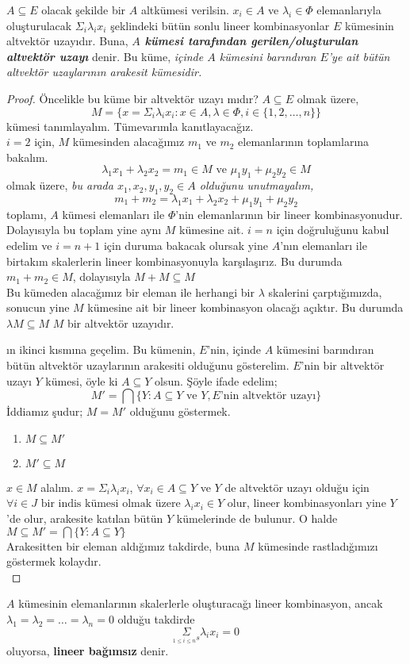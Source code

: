 \documentclass[11pt]{article}
\theoremstyle{plain}
\theoremstyle{definition}
\theoremstyle{remark}
\numberwithin{equation}{section}
\renewcommand{\%}{{\small \%}}
\begin{document}
$A\subseteq E$ olacak şekilde bir $A$ altkümesi verilsin. $x_{i}\in A$ ve $\lambda_{i}\in\Phi$ elemanlarıyla oluşturulacak $\Sigma_{i}\lambda_{i}x_i$ şeklindeki bütün sonlu lineer kombinasyonlar $E$ kümesinin altvektör uzayıdır. Buna,\emph{\textbf{ $A$ kümesi tarafından gerilen/oluşturulan altvektör uzayı}} denir. Bu küme, \emph{içinde $A$ kümesini barındıran $E$'ye ait bütün altvektör uzaylarının arakesit kümesidir.}

\begin{proof}
Öncelikle bu küme bir altvektör uzayı mıdır? $A\subseteq E$ olmak üzere, 
\[
M=\big\{x=\Sigma_{i}\lambda_{i}x_i:  x\in A, \lambda\in\Phi, i\in\{1,2,\ldots ,n\}\big\} 
\]
kümesi tanımlayalım. Tümevarımla kanıtlayacağız.\\
$i=2$ için, $M$ kümesinden alacağımız $m_1$ ve $m_2$ elemanlarının toplamlarına bakalım. 
\[
\lambda_1 x_1 +\lambda_2 x_2=m_1 \in M \text{ ve } \mu_1 y_1 +\mu_2 y_2 \in M 
\]
olmak üzere, \emph {bu arada $x_1 ,x_2 ,y_1 ,y_2 \in A$ olduğunu unutmayalım,}
\[
m_1 +m_2 =\lambda_1 x_1 +\lambda_2 x_2 +\mu_1 y_1 +\mu_2 y_2
\]
toplamı, $A$ kümesi elemanları ile $\Phi$'nin elemanlarının bir lineer kombinasyonudur. Dolayısıyla bu toplam yine aynı $M$ kümesine ait. $i=n$ için doğruluğunu kabul edelim ve $i=n+1$ için duruma bakacak olursak yine $A$'nın elemanları ile birtakım skalerlerin lineer kombinasyonuyla karşılaşırız. Bu durumda $m_1 +m_2 \in M$, dolayısıyla $M+M\subseteq M$ \checkmark \\
Bu kümeden alacağımız bir eleman ile herhangi bir $\lambda$ skalerini çarptığımızda, sonucun yine $M$ kümesine ait bir lineer kombinasyon olacağı açıktır. Bu durumda $\lambda M\subseteq M$ $M$ bir altvektör uzayıdır. \checkmark

ın ikinci kısmına geçelim. Bu kümenin, $E$'nin, içinde $A$ kümesini barındıran bütün altvektör uzaylarının arakesiti olduğunu gösterelim.
$E$'nin bir altvektör uzayı $Y$ kümesi, öyle ki $A\subseteq Y$ olsun. Şöyle ifade edelim;
\[
M'=\bigcap\Big\{Y: A\subseteq Y \text{ ve } Y, E\text{'nin altvektör uzayı}\Big\}
\]
İddiamız şudur; $M=M'$ olduğunu göstermek.
\begin{enumerate}   
\item$M\subseteq M'$ 
\item$M'\subseteq M$\\
\end{enumerate}
$x\in M$ alalım. $x=\Sigma_{i}\lambda_{i}x_i$, $\forall x_i \in A\subseteq Y$ ve $Y$ de altvektör uzayı olduğu için $\forall i\in J \text{ bir indis kümesi olmak üzere } \lambda_i x_i\in Y$ olur, lineer kombinasyonları yine $Y$'de olur, arakesite katılan bütün $Y$ kümelerinde de bulunur. O halde $M\subseteq M'=\bigcap\Big\{Y: A\subseteq Y\Big\}$\\
Arakesitten bir eleman aldığımız takdirde, buna $M$ kümesinde rastladığımızı göstermek kolaydır.\\[5pt]
\end{proof}
$A$ kümesinin elemanlarının skalerlerle oluşturacağı lineer kombinasyon, ancak $\lambda_1 =\lambda_2 =\ldots =\lambda_n =0$ olduğu takdirde \[\underset{_{1\leq i\leq n}s}\Sigma\lambda_i x_i =0\] oluyorsa, \textbf{lineer bağımsız} denir.
\end{document}
